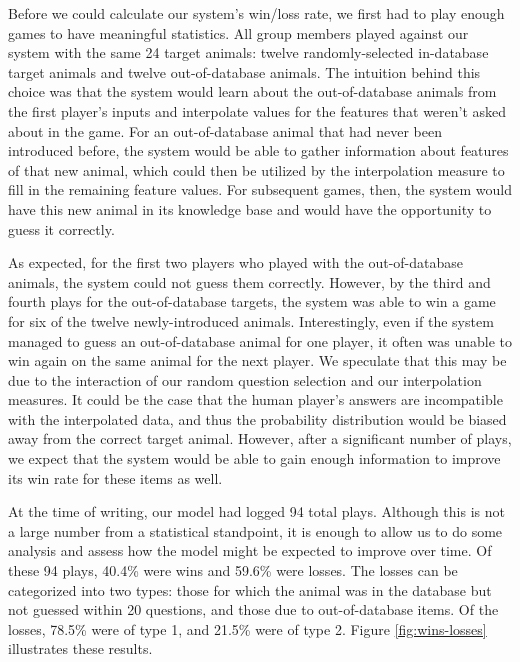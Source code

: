 \documentclass[11pt,a4paper]{article}
\begin{document}
{Before we could calculate our system's win/loss rate, we first had to play enough games to have meaningful statistics. 
All group members played against our system with the same 24 target animals: twelve randomly-selected in-database target animals and twelve out-of-database animals. 
The intuition behind this choice was that the system would learn about the out-of-database animals from the first player's inputs and interpolate values for the features that weren't asked about in the game. 
For an out-of-database animal that had never been introduced before, the system would be able to gather information about features of that new animal, which could then be utilized by the interpolation measure to fill in the remaining feature values. 
For subsequent games, then, the system would have this new animal in its knowledge base and would have the opportunity to guess it correctly. 

As expected, for the first two players who played with the out-of-database animals, the system could not guess them correctly.
However, by the third and fourth plays for the out-of-database targets, the system was able to win a game for six of the twelve newly-introduced animals.
Interestingly, even if the system managed to guess an out-of-database animal for one player, it often was unable to win again on the same animal for the next player.
We speculate that this may be due to the interaction of our random question selection and our interpolation measures. 
It could be the case that the human player's answers are incompatible with the interpolated data, and thus the probability distribution would be biased away from the correct target animal. 
However, after a significant number of plays, we expect that the system would be able to gain enough information to improve its win rate for these items as well.

At the time of writing, our model had logged 94 total plays. Although this is not a large number from a statistical standpoint, it is enough to allow us to do some analysis and assess how the model might be expected to improve over time. Of these 94 plays, 40.4\% were wins and 59.6\% were losses. The losses can be categorized into two types: those for which the animal was in the database but not guessed within 20 questions, and those due to out-of-database items. Of the losses, 78.5\% were of type 1, and 21.5\% were of type 2. 
Figure \ref{fig:wins-losses} illustrates these results. 

}
\end{document}
